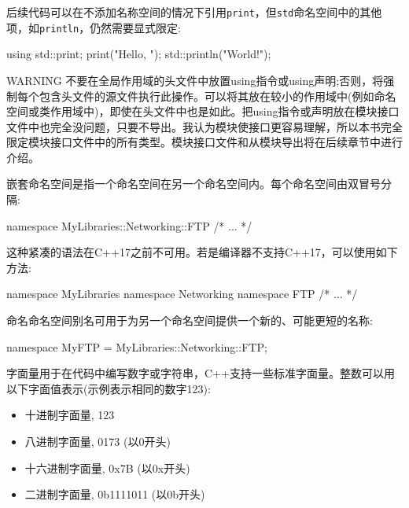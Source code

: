 后续代码可以在不添加名称空间的情况下引用\verb|print|，但\verb|std|命名空间中的其他项，如\verb|println|，仍然需要显式限定:

\begin{cpp}
using std::print;
print("Hello, ");
std::println("World!");
\end{cpp}

\begin{myWarning}{WARNING}
不要在全局作用域的头文件中放置using指令或using声明;否则，将强制每个包含头文件的源文件执行此操作。可以将其放在较小的作用域中(例如命名空间或类作用域中)，即使在头文件中也是如此。把using指令或声明放在模块接口文件中也完全没问题，只要不导出。我认为模块使接口更容易理解，所以本书完全限定模块接口文件中的所有类型。模块接口文件和从模块导出将在后续章节中进行介绍。
\end{myWarning}


嵌套命名空间是指一个命名空间在另一个命名空间内。每个命名空间由双冒号分隔:

\begin{cpp}
namespace MyLibraries::Networking::FTP {
    /* ... */
}
\end{cpp}

这种紧凑的语法在C++17之前不可用。若是编译器不支持C++17，可以使用如下方法:

\begin{cpp}
namespace MyLibraries {
    namespace Networking {
        namespace FTP {
            /* ... */
        }
    }
}
\end{cpp}


命名命名空间别名可用于为另一个命名空间提供一个新的、可能更短的名称:

\begin{cpp}
namespace MyFTP = MyLibraries::Networking::FTP;
\end{cpp}


字面量用于在代码中编写数字或字符串，C++支持一些标准字面量。整数可以用以下字面值表示(示例表示相同的数字123):

\begin{itemize}
\item
十进制字面量, 123

\item
八进制字面量, 0173 (以0开头)

\item
十六进制字面量, 0x7B (以0x开头)

\item
二进制字面量, 0b1111011 (以0b开头)
\end{itemize}


